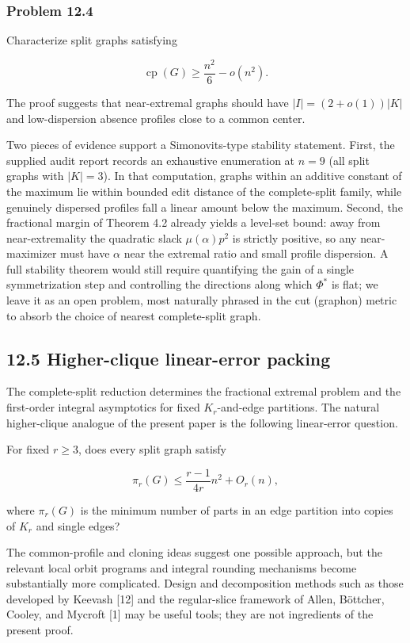 \documentclass[
  american,
  11pt,
  a4paper,
]{article}
\begin{document}
\subsubsection{Problem 12.4}\label{problem-12.4}

Characterize split graphs satisfying

\[
\operatorname{cp}(G)
\ge
\frac{n^2}{6}-o(n^2).
\]

The proof suggests that near-extremal graphs should have \(|I|=(2+o(1))|K|\) and low-dispersion absence profiles close to a common center.

Two pieces of evidence support a Simonovits-type stability statement. First, the supplied audit report records an exhaustive enumeration at \(n=9\) (all split graphs with \(|K|=3\)). In that computation, graphs within an additive constant of the maximum lie within bounded edit distance of the complete-split family, while genuinely dispersed profiles fall a linear amount below the maximum. Second, the fractional margin of Theorem 4.2 already yields a level-set bound: away from near-extremality the quadratic slack \(\mu(\alpha)p^2\) is strictly positive, so any near-maximizer must have \(\alpha\) near the extremal ratio and small profile dispersion. A full stability theorem would still require quantifying the gain of a single symmetrization step and controlling the directions along which \(\Phi^*\) is flat; we leave it as an open problem, most naturally phrased in the cut (graphon) metric to absorb the choice of nearest complete-split graph.

\subsection{12.5 Higher-clique linear-error packing}\label{higher-clique-linear-error-packing}

The complete-split reduction determines the fractional extremal problem and the first-order integral asymptotics for fixed \(K_r\)-and-edge partitions. The natural higher-clique analogue of the present paper is the following linear-error question.

For fixed \(r\ge3\), does every split graph satisfy

\[
\pi_r(G)
\le
\frac{r-1}{4r}n^2+O_r(n),
\]

where \(\pi_r(G)\) is the minimum number of parts in an edge partition into copies of \(K_r\) and single edges?

The common-profile and cloning ideas suggest one possible approach, but the relevant local orbit programs and integral rounding mechanisms become substantially more complicated. Design and decomposition methods such as those developed by Keevash {[}12{]} and the regular-slice framework of Allen, Böttcher, Cooley, and Mycroft {[}1{]} may be useful tools; they are not ingredients of the present proof.
\end{document}
